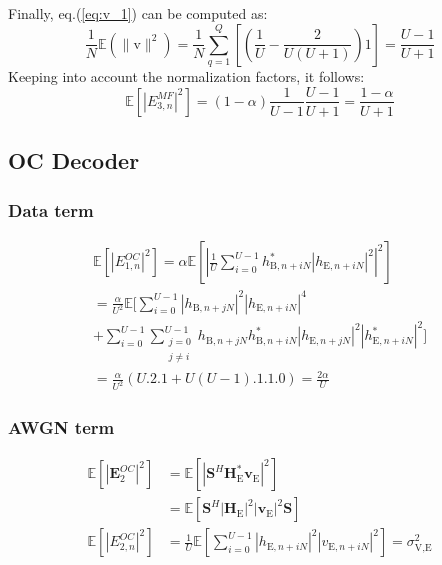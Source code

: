 \documentclass[journal,comsoc]{IEEEtran}
\newcommand{\module}[1]{\left|#1\right|}
\newcommand{\EX}[1]{\mathbb{E} \left[#1\right]}%
\newcommand{\HE}{\textbf{H}_{\text{E}}}
\newcommand{\ve}{\textbf{v}_{\text{E}}}
\newcommand{\spread}{\textbf{S}}
\newcommand{\vect}[1]{\boldsymbol{\mathrm{#1}}}
\begin{document}
Finally, eq.(\ref{eq:v_1}) can be computed as:
\begin{equation}
	\frac{1}{N}\mathbb{E}\left(\|\vect{v}\|^2\right)=\frac{1}{N} \sum_{q=1}^{Q} \left[ \left( \frac{1}{U} - \frac{2}{U(U+1)} \right) 1\right] = \frac{U-1}{U+1} \label{eq:final_an_result_no_correction}
\end{equation}
Keeping into account the normalization factors, it follows:
\begin{equation}
	\EX{|E_{3,n}^{MF}|^2} = (1-\alpha)\frac{1}{U-1}\frac{U-1}{U+1}  =  \frac{1-\alpha}{U+1}
	\label{eq:an_eve_filt1-app}
\end{equation}


\subsection{OC Decoder}\label{sec:own-channel-knowledge-app}
\subsubsection{Data term}\label{sec:data-term-app-3}
\begin{multline}
	\EX{|E_{1,n}^{OC}|^2} = \alpha \EX{\left|\frac{1}{U}\sum_{i=0}^{U-1} h_{\text{B}, n + iN}^* \left| h_{\text{E}, n + iN}\right|^2\right|^2} \\
	=\frac{\alpha}{U^2} \mathbb{E}\Bigg[ \sum_{i=0}^{U-1} \left| h_{\text{B}, n + jN}\right|^2 \left| h_{\text{E}, n + iN}\right|^4 \\
	+ \sum_{i=0}^{U-1}\sum_{\substack{j=0 \\ j\neq i}}^{U-1}  h_{\text{B}, n + jN} h^*_{\text{B}, n + iN} \left| h_{\text{E}, n + jN}\right|^2 \left| h^*_{\text{E}, n + iN}\right|^2 \Bigg] \\
	= \frac{\alpha}{U^2} \left(U.2.1 + U(U-1).1.1.0\right) = \frac{2\alpha}{U}
	\label{eq:data_eve_filt5-app}
\end{multline}


\subsubsection{AWGN term}\label{sec:awgn-term-app-3}
\begin{equation}
	\begin{split}
		\EX{|\textbf{E}_{2}^{OC}|^2} &=  \EX{\module{\spread^H \HE^* \ve}^2} \\
		&=\EX{\spread^H   \left|\HE\right|^2  \left|\ve\right|^2 \spread } \\
		\EX{|E_{2,n}^{OC}|^2} &= \frac{1}{U} \EX{\sum_{i=0}^{U-1} |h_{\text{E}, n + iN}|^2 |v_{\text{E}, n + iN}|^2} = \sigma^2_{\text{V,E}}
	\end{split}
	\label{eq:noise_eve_filt5-app}
\end{equation}
\end{document}
